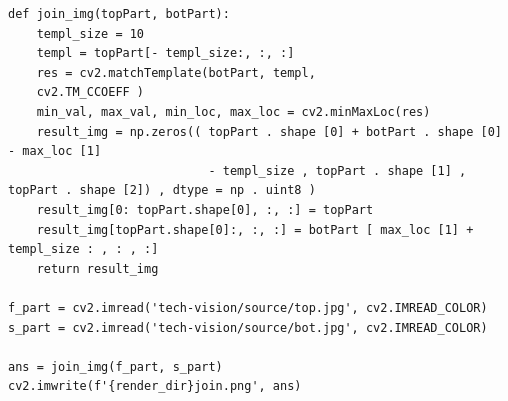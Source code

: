 \documentclass[a4paper, 16pt]{article}
\begin{document}
\begin{lstlisting}[label=join-code,caption=Код для склейки верхней части изображения с нижней]
def join_img(topPart, botPart):
    templ_size = 10
    templ = topPart[- templ_size:, :, :]
    res = cv2.matchTemplate(botPart, templ,
    cv2.TM_CCOEFF )
    min_val, max_val, min_loc, max_loc = cv2.minMaxLoc(res)
    result_img = np.zeros(( topPart . shape [0] + botPart . shape [0] - max_loc [1]
                            - templ_size , topPart . shape [1] , topPart . shape [2]) , dtype = np . uint8 )
    result_img[0: topPart.shape[0], :, :] = topPart
    result_img[topPart.shape[0]:, :, :] = botPart [ max_loc [1] + templ_size : , : , :]
    return result_img

f_part = cv2.imread('tech-vision/source/top.jpg', cv2.IMREAD_COLOR)
s_part = cv2.imread('tech-vision/source/bot.jpg', cv2.IMREAD_COLOR)

ans = join_img(f_part, s_part)
cv2.imwrite(f'{render_dir}join.png', ans)
\end{lstlisting}
\end{document}
